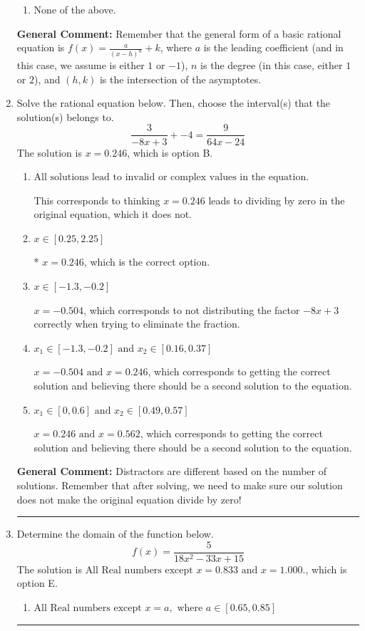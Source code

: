 \documentclass{extbook}[14pt]
\newcommand{\litem}[1]{\item #1

\rule{\textwidth}{0.4pt}}
\begin{document}
\begin{enumerate}
{\begin{enumerate}[label=\Alph*.]
\begin{multicols}{2}
\end{multicols}\item None of the above.\end{enumerate}
\textbf{General Comment:} Remember that the general form of a basic rational equation is $ f(x) = \frac{a}{(x-h)^n} + k$, where $a$ is the leading coefficient (and in this case, we assume is either $1$ or $-1$), $n$ is the degree (in this case, either $1$ or $2$), and $(h, k)$ is the intersection of the asymptotes.
}
\litem{
Solve the rational equation below. Then, choose the interval(s) that the solution(s) belongs to.
\[ \frac{3}{-8x + 3} + -4 = \frac{9}{64x -24} \]The solution is \( x = 0.246 \), which is option B.\begin{enumerate}[label=\Alph*.]
\item \( \text{All solutions lead to invalid or complex values in the equation.} \)

This corresponds to thinking $x = 0.246$ leads to dividing by zero in the original equation, which it does not.
\item \( x \in [0.25,2.25] \)

* $x = 0.246$, which is the correct option.
\item \( x \in [-1.3,-0.2] \)

$x = -0.504$, which corresponds to not distributing the factor $-8x + 3$ correctly when trying to eliminate the fraction.
\item \( x_1 \in [-1.3, -0.2] \text{ and } x_2 \in [0.16,0.37] \)

$x = -0.504 \text{ and } x = 0.246$, which corresponds to getting the correct solution and believing there should be a second solution to the equation.
\item \( x_1 \in [0, 0.6] \text{ and } x_2 \in [0.49,0.57] \)

$x = 0.246 \text{ and } x = 0.562$, which corresponds to getting the correct solution and believing there should be a second solution to the equation.
\end{enumerate}

\textbf{General Comment:} Distractors are different based on the number of solutions. Remember that after solving, we need to make sure our solution does not make the original equation divide by zero!
}
\litem{
Determine the domain of the function below.
\[ f(x) = \frac{5}{18x^{2} -33 x + 15} \]The solution is \( \text{All Real numbers except } x = 0.833 \text{ and } x = 1.000. \), which is option E.\begin{enumerate}[label=\Alph*.]
\item \( \text{All Real numbers except } x = a, \text{ where } a \in [0.65, 0.85] \)


\end{enumerate}}
\end{enumerate}
\end{document}
